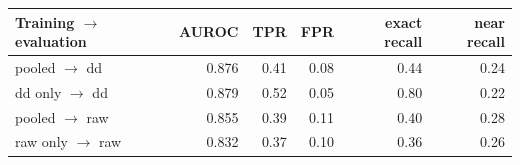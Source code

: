 \begin{tabular}{lrrrrr}
\toprule
Training $\to$ evaluation & AUROC & TPR & FPR & exact recall & near recall\\
\midrule
pooled $\to$ dd & 0.876 & 0.41 & 0.08 & 0.44 & 0.24\\
dd only $\to$ dd & 0.879 & 0.52 & 0.05 & 0.80 & 0.22\\
pooled $\to$ raw & 0.855 & 0.39 & 0.11 & 0.40 & 0.28\\
raw only $\to$ raw & 0.832 & 0.37 & 0.10 & 0.36 & 0.26\\
\bottomrule
\end{tabular}

